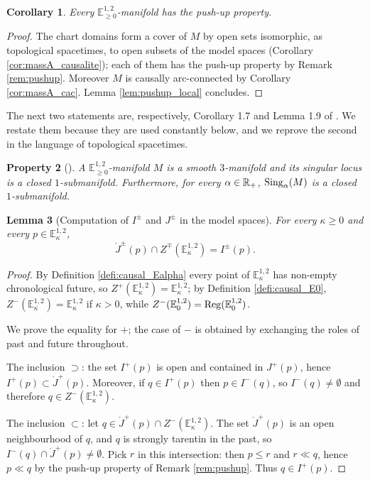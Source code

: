 \documentclass[a4paper,twoside]{article}
\newcommand{\mass}[1]{\mathbb{E}^{1,2}_{#1}}
\newtheorem{lem}{Lemma}[section]
\newtheorem{cor}[lem]{Corollary}
\newtheorem{propri}[lem]{Property}
\begin{document}
\begin{cor}\label{cor:pushup_sing}
Every $\mass{\geq0}$-manifold has the push-up property.
\end{cor}
\begin{proof}
The chart domains form a cover of $M$ by open sets isomorphic, as topological spacetimes, to open
subsets of the model spaces (Corollary \ref{cor:massA_causalite}); each of them has the push-up
property by Remark \ref{rem:pushup}. Moreover $M$ is causally arc-connected by Corollary
\ref{cor:massA_cac}. Lemma \ref{lem:pushup_local} concludes.
\end{proof}


The next two statements are, respectively, Corollary 1.7 and Lemma 1.9 of
\cite{brunswic2021cauchy}. We restate them because they are used constantly below, and we reprove
the second in the language of topological spacetimes.

\begin{propri}[{\cite[Cor.~1.7]{brunswic2021cauchy}}]\label{prop:GX_sing_dec}
A $\mass{\geq 0}$-manifold $M$ is a smooth $3$-manifold and its singular locus is a closed
$1$-submanifold. Furthermore, for every $\alpha\in \mathbb R_+$, $\mathrm{Sing}_\alpha(M)$ is a closed
$1$-submanifold.
\end{propri}

\begin{lem}[Computation of $I^\pm$ and $J^\pm$ in the model spaces]\label{lem:IJ_calc}
For every $\kappa\geq 0$ and every $p\in \mass{\kappa}$,
$$\ring J^\pm(p)\cap Z^\mp(\mass{\kappa})=I^\pm(p).$$
\end{lem}
\begin{proof}
By Definition \ref{defi:causal_Ealpha} every point of $\mass{\kappa}$ has non-empty chronological
future, so $Z^+(\mass{\kappa})=\mass{\kappa}$; by Definition \ref{defi:causal_E0},
$Z^-(\mass{\kappa})=\mass{\kappa}$ if $\kappa>0$, while $Z^-(\mass{0})=\reg(\mass{0})$.

We prove the equality for $+$; the case of $-$ is obtained by exchanging the roles of past and
future throughout.

The inclusion $\supset$: the set $I^+(p)$ is open and contained in $J^+(p)$, hence
$I^+(p)\subset \ring J^+(p)$. Moreover, if $q\in I^+(p)$ then $p\in I^-(q)$, so $I^-(q)\neq
\emptyset$ and therefore $q\in Z^-(\mass{\kappa})$.

The inclusion $\subset$: let $q\in \ring J^+(p)\cap Z^-(\mass{\kappa})$. The set $\ring J^+(p)$ is
an open neighbourhood of $q$, and $q$ is strongly tarentin in the past, so
$I^-(q)\cap \ring J^+(p)\neq \emptyset$. Pick $r$ in this intersection: then $p\leq r$ and
$r\ll q$, hence $p\ll q$ by the push-up property of Remark \ref{rem:pushup}. Thus $q\in I^+(p)$.
\end{proof}
\end{document}
